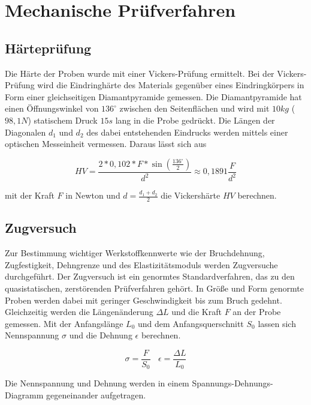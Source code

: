 \section{Mechanische Prüfverfahren}

\subsection{Härteprüfung}

Die Härte der Proben wurde mit einer Vickers-Prüfung ermittelt. Bei der Vickers-Prüfung wird die Eindringhärte des Materials gegenüber eines Eindringkörpers in Form einer gleichseitigen Diamantpyramide gemessen. Die Diamantpyramide hat einen Öffnungswinkel von $136^\circ$ zwischen den Seitenflächen und wird mit $10 kg$ ($98,1 N$) statischem Druck $15 s$ lang in die Probe gedrückt. Die Längen der Diagonalen $d_1$ und $d_2$ des dabei entstehenden Eindrucks werden mittels einer optischen Messeinheit vermessen. Daraus lässt sich aus

\begin{equation}
HV=\frac {2*0,102*F*\sin \left( \frac{136^\circ}{2}\right) } {d^2} \approx 0,1891 \frac{F}{d^2}
	\label{eq:HV}
\end{equation}

mit der Kraft $F$ in Newton und $d=\frac {d_1 + d_2}{2} $ die Vickershärte $HV$ berechnen. 

\subsection{Zugversuch}
Zur Bestimmung wichtiger Werkstoffkennwerte wie der Bruchdehnung, Zugfestigkeit, Dehngrenze und des Elastizitätsmoduls werden Zugversuche durchgeführt. Der Zugversuch ist ein genormtes Standardverfahren, das zu den quasistatischen, zerstörenden Prüfverfahren gehört. In Größe und Form genormte Proben werden dabei mit geringer Geschwindigkeit bis zum Bruch gedehnt. Gleichzeitig werden die Längenänderung $\Delta L$ und die Kraft $F$ an der Probe gemessen. Mit der Anfangslänge $L_0$ und dem Anfangsquerschnitt $S_0$ lassen sich Nennspannung $\sigma$ und die Dehnung $\epsilon$ berechnen.

\begin{equation}

	\sigma=\frac{F}{S_0} ~~~~
	\epsilon=\frac{\Delta L} {L_0}
\end{equation}

Die Nennspannung und Dehnung werden in einem Spannungs-Dehnungs-Diagramm gegeneinander aufgetragen. 